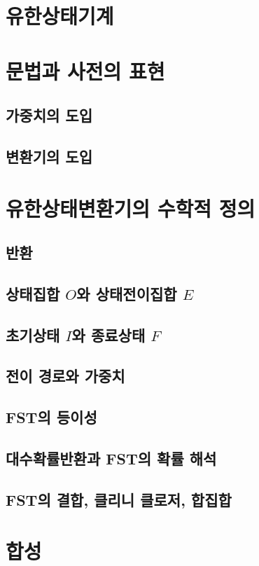 \documentclass[../main.tex]{subfiles}
\begin{document}
\section{유한상태기계}

\section{문법과 사전의 표현}
\subsection{가중치의 도입}
\subsection{변환기의 도입}

\section{유한상태변환기의 수학적 정의}
\subsection{반환}
\subsection{상태집합 \texorpdfstring{$O$}{O}와 상태전이집합 \texorpdfstring{$E$}{E}}
\subsection{초기상태 \texorpdfstring{$I$}{I}와 종료상태 \texorpdfstring{$F$}{F}}
\subsection{전이 경로와 가중치}
\subsection{FST의 등이성}
\subsection{대수확률반환과 FST의 확률 해석}
\subsection{FST의 결합, 클리니 클로저, 합집합}

\section{합성}
\end{document}
